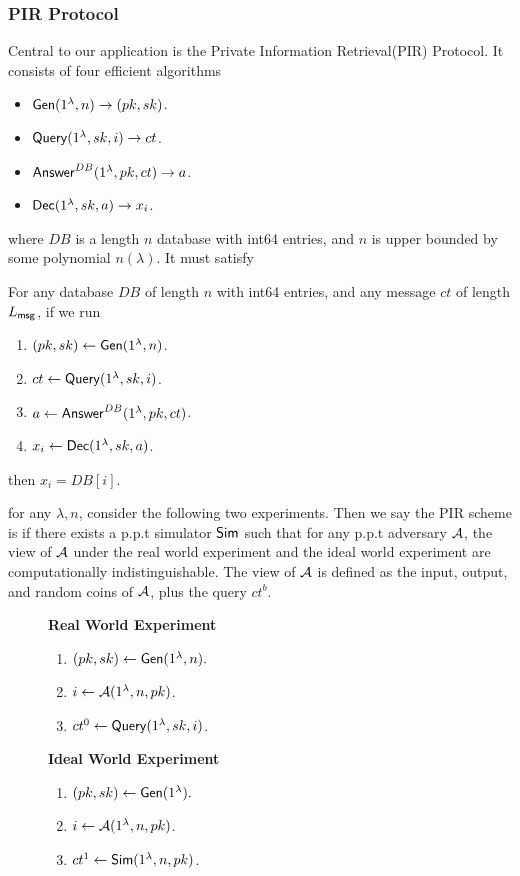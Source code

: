 \subsubsection{PIR Protocol}
Central to our application is the Private Information Retrieval(PIR) Protocol. It consists of four efficient algorithms
\begin{itemize}
    \item $\mathsf{Gen}(1^{\lambda}, n) \to (pk, sk)$.
    \item $\mathsf{Query}(1^{\lambda}, sk, i) \to ct$.
    \item $\mathsf{Answer}^{DB}(1^{\lambda}, pk, ct) \to a$.
    \item $\mathsf{Dec}(1^{\lambda}, sk, a) \to x_i$.
\end{itemize}
where $DB$ is a length $n$ database with int64 entries, and $n$ is upper bounded by some polynomial $n(\lambda)$. It must satisfy
\begin{definition}[Correctness]
For any database $DB$ of length $n$ with int64 entries, and any message $ct$ of length $L_{\mathsf{msg}}$, if we run
\begin{enumerate}
    \item $(pk, sk) \leftarrow \mathsf{Gen}(1^{\lambda}, n)$.
    \item $ct \leftarrow \mathsf{Query}(1^{\lambda}, sk, i)$.
    \item $a \leftarrow \mathsf{Answer}^{DB}(1^{\lambda}, pk, ct)$.
    \item $x_i \leftarrow \mathsf{Dec}(1^{\lambda}, sk, a)$.
\end{enumerate}
then $x_i = DB[i]$.
\end{definition}
\begin{definition}[Privacy]
for any $\lambda, n$, consider the following two experiments. Then we say the PIR scheme is  if there exists a p.p.t simulator $\mathsf{Sim}$ such that for any p.p.t adversary $\mathcal{A}$, the view of $\mathcal{A}$ under the real world experiment and the ideal world experiment are computationally indistinguishable. The view of $\mathcal{A}$ is defined as the input, output, and random coins of $\mathcal{A}$, plus the query $ct^b$.
\begin{figure}[h!]
\begin{framed}
\textbf{Real World Experiment}
\begin{enumerate}
    \item $(pk, sk) \leftarrow \mathsf{Gen}(1^{\lambda}, n).$
    \item $i \leftarrow \mathcal{A}(1^{\lambda}, n, pk)$.
    \item $ct^0 \leftarrow \mathsf{Query}(1^{\lambda}, sk, i)$.
\end{enumerate}
\textbf{Ideal World Experiment}
\begin{enumerate}
    \item $(pk, sk) \leftarrow \mathsf{Gen}(1^{\lambda}).$
    \item $i \leftarrow \mathcal{A}(1^{\lambda}, n, pk)$.
    \item $ct^1 \leftarrow \mathsf{Sim}(1^{\lambda}, n, pk)$.
\end{enumerate}
\end{framed}
\end{figure}
\end{definition}
